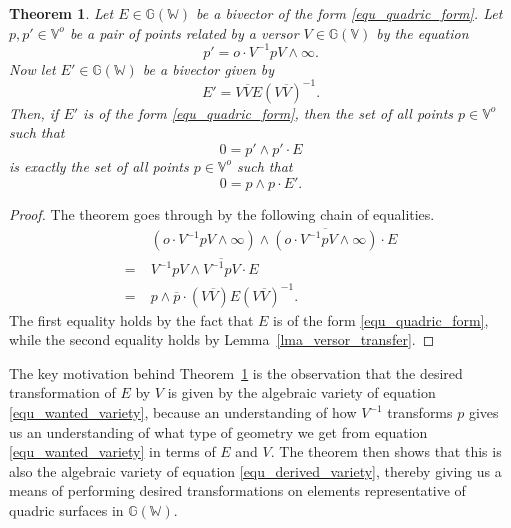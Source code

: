 \documentclass{birkjour}
\newtheorem{thm}{Theorem}[section]
\theoremstyle{definition}
\theoremstyle{remark}
\numberwithin{equation}{section}
\newcommand{\G}{\mathbb{G}}
\newcommand{\V}{\mathbb{V}}
\newcommand{\W}{\mathbb{W}}
\newcommand{\nvao}{o}
\newcommand{\nvai}{\infty}
\begin{document}
\begin{thm}\label{thm_quadric_transform}
Let $E\in\G(\W)$ be a bivector of the form \eqref{equ_quadric_form}.
Let $p,p'\in\V^o$ be a pair of points related by a versor $V\in\G(\V)$ by
the equation
\begin{equation}\label{equ_get_rid_ni}
p' = \nvao\cdot V^{-1}pV\wedge\nvai.
\end{equation}
Now let $E'\in\G(\W)$ be a bivector given by
\begin{equation}\label{equ_transformed_surface}
E' = V\overline{V}E(V\overline{V})^{-1}.
\end{equation}
Then, if $E'$ is of the form \eqref{equ_quadric_form}, then the
set of all points $p\in\V^\nvao$ such that
\begin{equation}\label{equ_wanted_variety}
0 = p'\wedge p'\cdot E
\end{equation}
is exactly the set of all points $p\in\V^\nvao$ such that
\begin{equation}\label{equ_derived_variety}
0 = p\wedge p\cdot E'.
\end{equation}
\end{thm}
\begin{proof}
The theorem goes through by the following chain of equalities.
\begin{align}
 & (\nvao\cdot V^{-1}pV\wedge\nvai)\wedge\overline{(\nvao\cdot V^{-1}pV\wedge\nvai)}\cdot E \\
=\;& V^{-1}pV\wedge\overline{V^{-1}pV}\cdot E \\
=\;& p\wedge\overline{p}\cdot(V\overline{V})E(V\overline{V})^{-1}.
\end{align}
The first equality holds by the fact that $E$ is of the form \eqref{equ_quadric_form},
while the second equality holds by Lemma~\ref{lma_versor_transfer}.
\end{proof}

The key motivation behind Theorem~\ref{thm_quadric_transform} is
the observation that the desired transformation of $E$ by $V$ is
given by the algebraic variety of equation \eqref{equ_wanted_variety}, because
an understanding of how $V^{-1}$ transforms $p$ gives us an understanding
of what type of geometry we get from equation \eqref{equ_wanted_variety} in terms of $E$ and $V$.
The theorem then
shows that this is also the algebraic variety of equation \eqref{equ_derived_variety}, thereby
giving us a means of performing desired transformations on elements representative
of quadric surfaces in $\G(\W)$.
\end{document}
